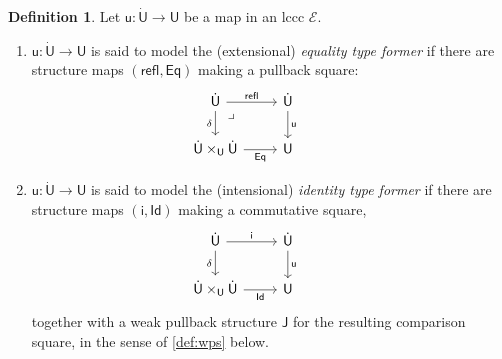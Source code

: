 \documentclass[12pt,reqno]{amsart}
\newcommand{\EE}{\ensuremath{\mathcal{E}}}
\renewcommand{\to}{\ensuremath{\rightarrow}}
\newcommand{\refl}{\mathsf{refl}}
\renewcommand{\t}{\ensuremath{\mathsf{u}}}
\newcommand{\T}{\ensuremath{\mathsf{U}}}
\newcommand{\TT}{\ensuremath{\dot{\mathsf{U}}}}
\newcommand{\tT}{\ensuremath{{\t}:\TT\to\T}}
\newcommand{\pbcorner}{\arrow[dr,phantom,"\lrcorner" very near start, shift right=.5ex]} %
\theoremstyle{remark}
\theoremstyle{definition}
\newtheorem{definition}[theorem]{Definition}
\begin{document}
\begin{definition}\label{def:EqualityandIdentityTypes}
Let $\tT$ be a map in an lccc $\EE$. 
\begin{enumerate}
\item\label{def:equalitytype}  $\tT$ is said to  model the (extensional) \emph{equality type former} if there are structure maps $(\refl, \mathsf{Eq})$ making a pullback square:
\begin{equation*}\label{diag:Eqtypes}
\begin{tikzcd}
	\TT \ar[r,"\refl"] \ar[d,swap,"\delta"] \pbcorner &  \TT \ar[d, "\t"]\\  
	\TT \times_\T \TT \ar[r, swap,"\mathsf{Eq}"] & \T
 \end{tikzcd}\qquad \qquad 
 \end{equation*}
\item\label{def:identitytype}   $\tT$ is said to model the (intensional) \emph{identity type former} if there are structure maps $(\mathsf{i}, \mathsf{Id})$ making a commutative square,
\begin{equation}\label{diag:Idtypes}
\begin{tikzcd}
	\TT \ar[r,"\mathsf{i}"] \ar[d,swap,"\delta"] &  \TT \ar[d, "\t"]\\  
	\TT \times_\T \TT \ar[r, swap,"\mathsf{Id}"] & \T
 \end{tikzcd}\qquad \qquad 
 \end{equation}
 together with a weak pullback structure $\mathsf{J}$ for the resulting comparison square, in the sense of \eqref{def:wps} below. 
 \end{enumerate}
   \end{definition}
\end{document}
